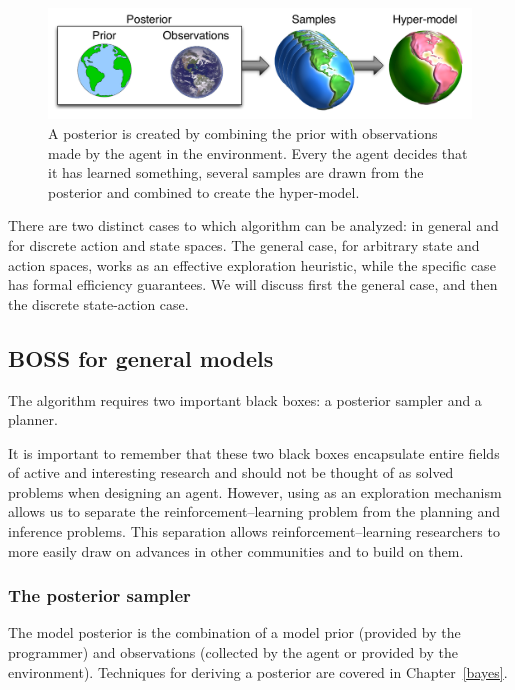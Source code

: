 \begin{figure}[t]
\begin{center}
\includegraphics[width=0.9\linewidth]{hypermodels}
\caption{A posterior is created by combining the prior with observations made by the agent in the environment. Every the agent decides that it has learned something, several samples are drawn from the posterior and combined to create the hyper-model.}
\label{sec:boss:hyper-model}
\end{center}
\end{figure}



There are two distinct cases to which  algorithm can be analyzed: in general and for discrete action and state spaces. The general case, for arbitrary state and action spaces, works as an effective exploration heuristic, while the specific case has formal efficiency guarantees. We will discuss first the general case, and then the discrete state-action case.

\subsection{BOSS for general models} 

The  algorithm requires two important black boxes: a posterior sampler and a planner. 

It is important to remember that these two black boxes encapsulate entire fields of active and interesting research and should not be thought of as solved problems when designing an agent. However, using  as an exploration mechanism allows us to separate the reinforcement--learning problem from the planning and inference problems. This separation allows reinforcement--learning researchers to more easily draw on advances in other communities and to build on them.

\subsubsection{The posterior sampler}

The model posterior is the combination of a model prior (provided by the programmer) and observations (collected by the agent or provided by the environment). Techniques for deriving a posterior are covered in Chapter~\ref{bayes}.

